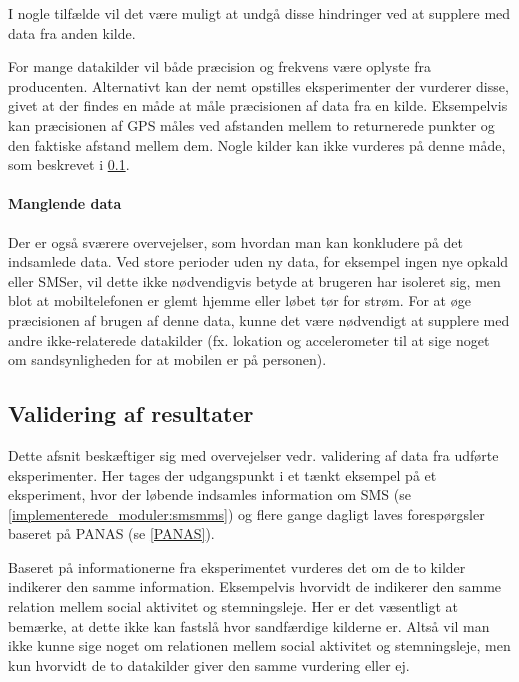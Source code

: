 I nogle tilfælde vil det være muligt at undgå disse hindringer ved at supplere med data fra anden kilde.

For mange datakilder vil både præcision og frekvens være oplyste fra producenten.
Alternativt kan der nemt opstilles eksperimenter der vurderer disse, givet at der findes en måde at måle præcisionen af data fra en kilde.
Eksempelvis kan præcisionen af GPS måles ved afstanden mellem to returnerede punkter og den faktiske afstand mellem dem.
Nogle kilder kan ikke vurderes på denne måde, som beskrevet i \cref{reflection:valid_resultater}.

\paragraph{Manglende data}
Der er også sværere overvejelser, som hvordan man kan konkludere på det indsamlede data.
Ved store perioder uden ny data, for eksempel ingen nye opkald eller SMSer, vil dette ikke nødvendigvis betyde at brugeren har isoleret sig, men blot at mobiltelefonen er glemt hjemme eller løbet tør for strøm.
For at øge præcisionen af brugen af denne data, kunne det være nødvendigt at supplere med andre ikke-relaterede datakilder (fx. lokation og accelerometer til at sige noget om sandsynligheden for at mobilen er på personen).

\subsection{Validering af resultater}\label{reflection:valid_resultater}
Dette afsnit beskæftiger sig med overvejelser vedr. validering af data fra udførte eksperimenter.
Her tages der udgangspunkt i et tænkt eksempel på et eksperiment, hvor der løbende indsamles information om SMS (se \cref{implementerede_moduler:smsmms}) og flere gange dagligt laves forespørgsler baseret på PANAS (se \cref{PANAS}).

Baseret på informationerne fra eksperimentet vurderes det om de to kilder indikerer den samme information.
Eksempelvis hvorvidt de indikerer den samme relation mellem social aktivitet og stemningsleje.
Her er det væsentligt at bemærke, at dette ikke kan fastslå hvor sandfærdige kilderne er.
Altså vil man ikke kunne sige noget om relationen mellem social aktivitet og stemningsleje, men kun hvorvidt de to datakilder giver den samme vurdering eller ej.

